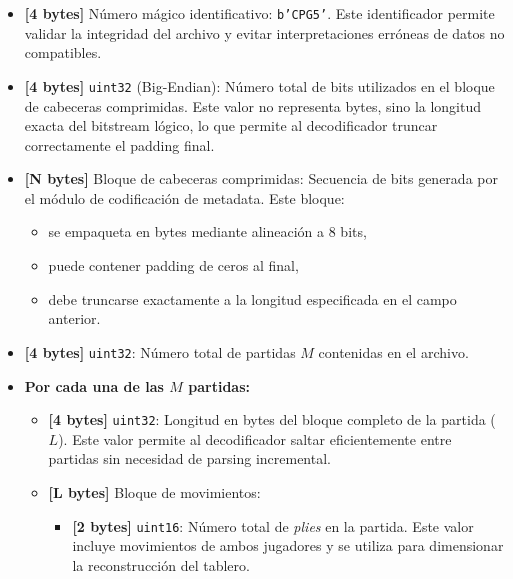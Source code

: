 \documentclass[11pt, letterpaper]{article}
\begin{document}
\begin{tcolorbox}[breakable, colback=gray!10, colframe=black]
\begin{itemize}

\item \textbf{[4 bytes]} Número mágico identificativo:
\texttt{b'CPG5'}.
Este identificador permite validar la integridad del archivo y evitar interpretaciones erróneas de datos no compatibles.

\item \textbf{[4 bytes]} \texttt{uint32} (Big-Endian):
Número total de bits utilizados en el bloque de cabeceras comprimidas.
Este valor no representa bytes, sino la longitud exacta del bitstream lógico, lo que permite al decodificador truncar correctamente el padding final.

\item \textbf{[N bytes]} Bloque de cabeceras comprimidas:
Secuencia de bits generada por el módulo de codificación de metadata. Este bloque:
\begin{itemize}
    \item se empaqueta en bytes mediante alineación a 8 bits,
    \item puede contener padding de ceros al final,
    \item debe truncarse exactamente a la longitud especificada en el campo anterior.
\end{itemize}

\item \textbf{[4 bytes]} \texttt{uint32}:
Número total de partidas $M$ contenidas en el archivo.

\item \textbf{Por cada una de las $M$ partidas:}

\begin{itemize}

    \item \textbf{[4 bytes]} \texttt{uint32}:
    Longitud en bytes del bloque completo de la partida ($L$).
    Este valor permite al decodificador saltar eficientemente entre partidas sin necesidad de parsing incremental.

    \item \textbf{[L bytes]} Bloque de movimientos:

    \begin{itemize}

        \item \textbf{[2 bytes]} \texttt{uint16}:
        Número total de \textit{plies} en la partida.
        Este valor incluye movimientos de ambos jugadores y se utiliza para dimensionar la reconstrucción del tablero.


\end{itemize}
\end{itemize}
\end{itemize}
\end{tcolorbox}
\end{document}
